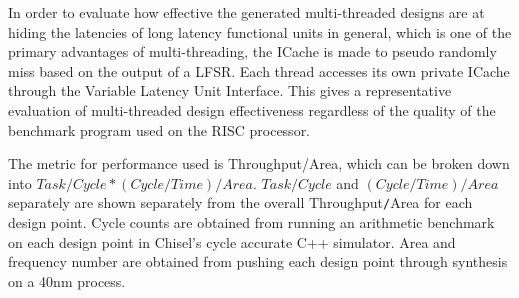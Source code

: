 In order to evaluate how effective the generated multi-threaded designs are at hiding the latencies of long latency functional units in general, which is one of the primary advantages of multi-threading, the ICache is made to pseudo randomly miss based on the output of a LFSR. Each thread accesses its own private ICache through the Variable Latency Unit Interface. This gives a representative evaluation of multi-threaded design effectiveness regardless of the quality of the benchmark program used on the RISC processor.

The metric for performance used is Throughput/Area, which can be broken down into $Task/Cycle * (Cycle/Time)/Area$. $Task/Cycle$ and $(Cycle/Time)/Area$ separately are shown separately from the overall Throughput{\tt /}Area for each design point. Cycle counts are obtained from running an arithmetic benchmark on each design point in Chisel's cycle accurate C++ simulator. Area and frequency number are obtained from pushing each design point through synthesis on a 40nm process.
